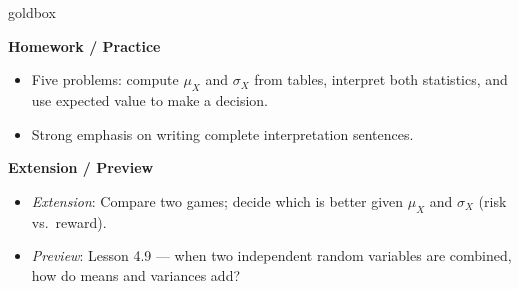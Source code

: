 \documentclass[10pt]{article}
\begin{document}
\begin{skillbox}{goldbox}
\begin{minipage}[t]{0.48\linewidth}
    \textbf{Homework / Practice}
    \begin{itemize}
        \item Five problems: compute $\mu_X$ and $\sigma_X$ from tables, interpret
              both statistics, and use expected value to make a decision.
        \item Strong emphasis on writing complete interpretation sentences.
    \end{itemize}
\end{minipage}
\hfill
\begin{minipage}[t]{0.48\linewidth}
    \textbf{Extension / Preview}
    \begin{itemize}
        \item \textit{Extension}: Compare two games; decide which is better given
              $\mu_X$ and $\sigma_X$ (risk vs.\ reward).
        \item \textit{Preview}: Lesson 4.9 --- when two independent random variables
              are combined, how do means and variances add?
    \end{itemize}
\end{minipage}
\end{skillbox}
\end{document}

